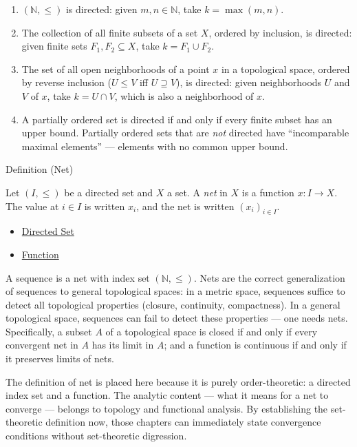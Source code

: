 \begin{example*}
\begin{enumerate}[label=(\roman*)]
\item $(\mathbb{N}, \leq)$ is directed: given $m, n \in \mathbb{N}$, take
$k = \max(m,n)$.
\item The collection of all finite subsets of a set $X$, ordered by inclusion,
is directed: given finite sets $F_1, F_2 \subseteq X$, take $k = F_1 \cup
F_2$.
\item The set of all open neighborhoods of a point $x$ in a topological space,
ordered by reverse inclusion ($U \leq V$ iff $U \supseteq V$), is directed:
given neighborhoods $U$ and $V$ of $x$, take $k = U \cap V$, which is also
a neighborhood of $x$.
\item A partially ordered set is directed if and only if every finite subset
has an upper bound. Partially ordered sets that are \emph{not} directed have
``incomparable maximal elements'' — elements with no common upper bound.
\end{enumerate}
\end{example*}

\begin{definitionbox}{Definition (Net)}
\begin{definition}[Net]\label{def:net}
Let $(I, \leq)$ be a directed set and $X$ a set. A \emph{net} in $X$ is a
function $x : I \to X$. The value at $i \in I$ is written $x_i$, and the
net is written $(x_i)_{i \in I}$.
\end{definition}
\end{definitionbox}

\begin{dependencies}
\begin{itemize}
  \item \hyperref[def:directed-set]{Directed Set}
  \item \hyperref[def:function]{Function}
\end{itemize}
\end{dependencies}

\begin{remark*}
A sequence is a net with index set $(\mathbb{N}, \leq)$. Nets are the correct
generalization of sequences to general topological spaces: in a metric space,
sequences suffice to detect all topological properties (closure, continuity,
compactness). In a general topological space, sequences can fail to detect
these properties — one needs nets. Specifically, a subset $A$ of a
topological space is closed if and only if every convergent net in $A$ has
its limit in $A$; and a function is continuous if and only if it preserves
limits of nets.

The definition of net is placed here because it is purely order-theoretic:
a directed index set and a function. The analytic content — what it means
for a net to converge — belongs to topology and functional analysis. By
establishing the set-theoretic definition now, those chapters can immediately
state convergence conditions without set-theoretic digression.
\end{remark*}
